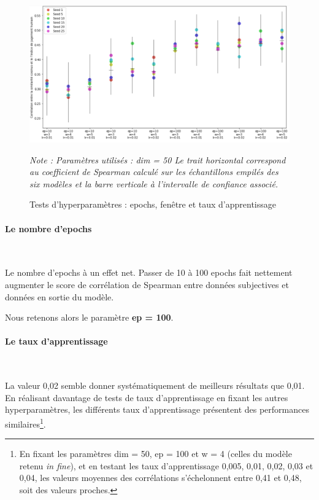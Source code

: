 \documentclass[11pt,french,french]{article}
\let\rmarkdownfootnote\footnote%
\def\footnote{\protect\rmarkdownfootnote}
\begin{document}
\begin{figure}
\begin{center}
\includegraphics[width=1\textwidth]{img/test_parametres.png}
\captionsetup{margin=0cm,format=hang,justification=justified}
\caption{Tests d'hyperparamètres : epochs, fenêtre et taux d'apprentissage}\label{fig:evaluation_1}
\end{center}
\vspace{-0.3cm}
\footnotesize
\emph{Note : Paramètres utilisés : dim = 50\newline
Le trait horizontal correspond au coefficient de Spearman calculé sur les échantillons empilés des six modèles et la barre verticale à l'intervalle de confiance associé.}
\end{figure}

\hypertarget{le-nombre-depochs}{%
\paragraph{Le nombre d'epochs}\label{le-nombre-depochs}}

~

Le nombre d'epochs à un effet net. Passer de 10 à 100 epochs fait nettement augmenter le score de corrélation de Spearman entre données subjectives et données en sortie du modèle.

\faArrowCircleRight{} Nous retenons alors le paramètre \textbf{ep = 100}.

\hypertarget{le-taux-dapprentissage}{%
\paragraph{Le taux d'apprentissage}\label{le-taux-dapprentissage}}

~

La valeur 0,02 semble donner systématiquement de meilleurs résultats que 0,01. En réalisant davantage de tests de taux d'apprentissage en fixant les autres hyperparamètres, les différents taux d'apprentissage présentent des performances similaires\footnote{En fixant les paramètres dim = 50, ep = 100 et w = 4 (celles du modèle retenu \emph{in fine}), et en testant les taux d'apprentissage 0,005, 0,01, 0,02, 0,03 et 0,04, les valeurs moyennes des corrélations s'échelonnent entre 0,41 et 0,48, soit des valeurs proches.}.
\end{document}
